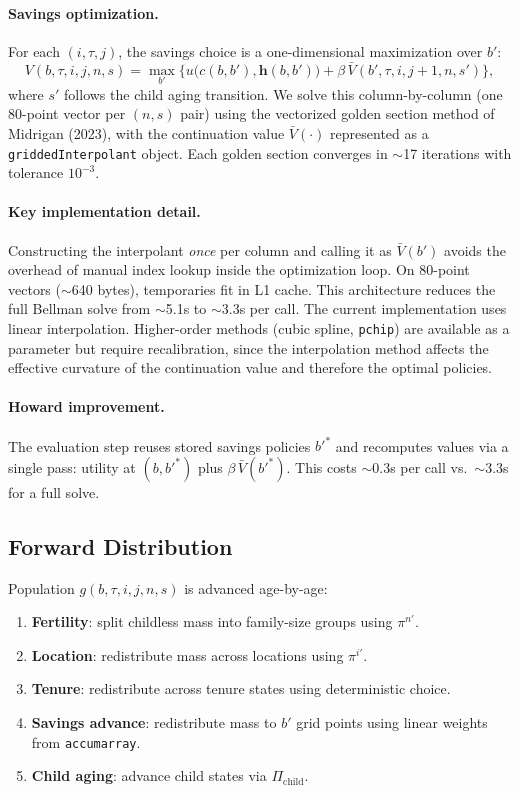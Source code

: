 \documentclass[11pt]{article}
\begin{document}
\paragraph{Savings optimization.} For each $(i,\tau,j)$, the savings choice is a one-dimensional maximization over $b'$:
\begin{equation}
V(b,\tau,i,j,n,s) = \max_{b'} \Big\{ u\big(c(b,b'),\mathbf h(b,b')\big) + \beta\,\bar V(b',\tau,i,j+1,n,s') \Big\},
\end{equation}
where $s'$ follows the child aging transition. We solve this column-by-column (one 80-point vector per $(n,s)$ pair) using the vectorized golden section method of Midrigan (2023), with the continuation value $\bar V(\cdot)$ represented as a \texttt{griddedInterpolant} object. Each golden section converges in $\sim$17 iterations with tolerance $10^{-3}$.

\paragraph{Key implementation detail.} Constructing the interpolant \emph{once} per column and calling it as $\bar V(b')$ avoids the overhead of manual index lookup inside the optimization loop. On 80-point vectors ($\sim$640 bytes), temporaries fit in L1 cache. This architecture reduces the full Bellman solve from $\sim$5.1s to $\sim$3.3s per call. The current implementation uses linear interpolation. Higher-order methods (cubic spline, \texttt{pchip}) are available as a parameter but require recalibration, since the interpolation method affects the effective curvature of the continuation value and therefore the optimal policies.

\paragraph{Howard improvement.} The evaluation step reuses stored savings policies $b'^*$ and recomputes values via a single pass: utility at $(b, b'^*)$ plus $\beta\,\bar V(b'^*)$. This costs $\sim$0.3s per call vs.\ $\sim$3.3s for a full solve.

\subsection{Forward Distribution}

Population $g(b,\tau,i,j,n,s)$ is advanced age-by-age:
\begin{enumerate}
	\item \textbf{Fertility}: split childless mass into family-size groups using $\pi^{n'}$.
	\item \textbf{Location}: redistribute mass across locations using $\pi^{i'}$.
	\item \textbf{Tenure}: redistribute across tenure states using deterministic choice.
	\item \textbf{Savings advance}: redistribute mass to $b'$ grid points using linear weights from \texttt{accumarray}.
	\item \textbf{Child aging}: advance child states via $\Pi_{\text{child}}$.
\end{enumerate}
\end{document}
